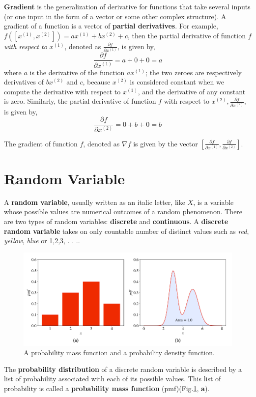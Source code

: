 \textbf{Gradient} is the generalization of derivative for functions that take several inputs (or one input in the form of a vector or some other complex structure). A gradient of a function is a vector of \textbf{partial derivatives}. For example, \(f\left(\left[x^{(1)}, x^{(2)}\right]\right)=a x^{(1)}+b x^{(2)}+c\), then the partial derivative of function \(f\) \textit{with respect to} \(x^{(1)}\), denoted as \(\frac{\partial f}{\partial x^{(1)}}\), is given by,
$$
	\frac{\partial f}{\partial x^{(1)}}=a+0+0=a
$$
where \(a\) is the derivative of the function \(a x^{(1)}\); the two zeroes are respectively derivatives of
\(b x^{(2)}\) and \(c\), because \(x^{(2)}\) is considered constant when we compute the derivative with respect
to \(x^{(1)}\), and the derivative of any constant is zero. Similarly, the partial derivative of function \(f\) with respect to \(x^{(2)}, \frac{\partial f}{\partial x^{(2)}}\), is given by,
$$
	\frac{\partial f}{\partial x^{(2)}}=0+b+0=b
$$

The gradient of function \(f\), denoted as \(\nabla f\) is given by the vector \(\left[\frac{\partial f}{\partial x^{(1)}}, \frac{\partial f}{\partial x^{(2)}}\right]\).

\section{Random Variable}

A \textbf{random variable}, usually written as an italic letter, like \(X\), is a variable whose possible values are numerical outcomes of a random phenomenon. There are two types of random variables: \textbf{discrete} and \textbf{continuous}. A \textbf{discrete random variable} takes on only countable number of distinct values such as \textit{red}, \textit{yellow}, \textit{blue} or 1,2,3, . . ..

\begin{figure}[H]
	\centering
	\includegraphics[width=0.7\linewidth]{imgs/notation/notation_4.png}
	\caption{A probability mass function and a probability density function.}
	\label{fig:notation_4}
\end{figure}
The \textbf{probability distribution} of a discrete random variable is described by a list of probability associated with each of its possible values. This list of probability is called a \textbf{probability mass function} (pmf)(Fig.\ref{fig:notation_4}, \textbf{a}).

